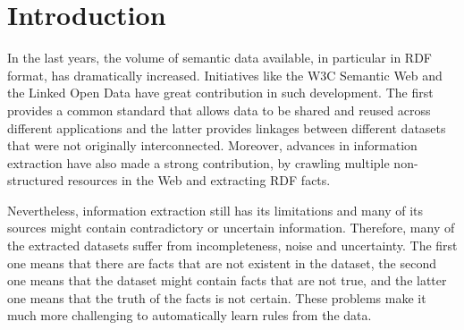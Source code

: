 \chapter{Introduction}
\label{ch:intro}

\begin{comment}
 Inductive Logic Programming (ILP) is a consolidated technique for mining first-order rules in knowledge bases.
Nevertheless, it's inherently expensive and the hypothesis search space grows combinatorially with the knowledge base
size. 
This problem is even more dramatic when literals with constants are considered. Therefore, it usually requires
very aggressive pruning for making it feasible. In the preprocessing step, we build a lattice that expresses the
correlations between a root numerical attribute and multiple categorical relations and their constants. This lattice
is then queried by the core ILP algorithm in the refinement step in order to obtain the interestingness of searching
for interesting intervals of a given numerical attribute variable, as well as a list of refinement suggestions ordered
by a defined interestingness measure. This thesis discusses how to efficiently build the lattice, how it's
incorporated in the core learning algorithm and evaluates different iterestingness measures.
\end{comment}


In the last years, the volume of semantic data available, in particular in RDF format, has dramatically
increased. Initiatives like the W3C Semantic Web and the Linked Open Data  have great contribution in such
development. The first provides a common standard that allows data to be shared and reused across different
applications and the latter provides linkages between different datasets that were not originally interconnected.
Moreover, advances in information extraction have also made a strong contribution, by crawling multiple non-structured
resources in the Web and extracting RDF facts.

Nevertheless, information extraction still has its limitations and many of its sources might contain contradictory
or uncertain information. Therefore, many of the extracted datasets suffer from incompleteness, noise and uncertainty.
The first one means that there are facts that are not existent in the dataset, the second one means that the dataset
might contain facts that are not true, and the latter one means that the truth of the facts is not certain. These
problems make it much more challenging to automatically learn rules from the data.

